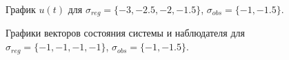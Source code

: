 \begin{figure}[!h]
	\caption{График $u(t)$ для $\sigma_{reg} = \{ -3, -2.5, -2, -1.5\}$, $\sigma_{obs}= \{-1, -1.5 \}$.}
	\label{3_u_k1l1}
\end{figure}

\begin{figure}[!h]
	\caption{Графики векторов состояния системы и наблюдателя для $\sigma_{reg} = \{ -1, -1, -1, -1\}$, $\sigma_{obs}= \{-1, -1.5 \}$.}
	\label{3_x_k2l1}
\end{figure}

